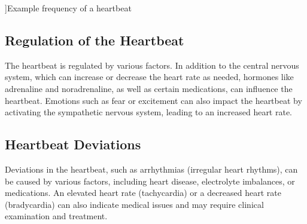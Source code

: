 {\begin{center}
        
        ]{Example frequency of a heartbeat}  \label{HeartRateFrequencies}	
    \end{center}
    
    \subsection{Regulation of the Heartbeat}
    
    The heartbeat is regulated by various factors. In addition to the central nervous system, which can increase or decrease the heart rate as needed, hormones like adrenaline and noradrenaline, as well as certain medications, can influence the heartbeat. Emotions such as fear or excitement can also impact the heartbeat by activating the sympathetic nervous system, leading to an increased heart rate. \cite{Gesenberg:2017}
    
    \subsection{Heartbeat Deviations}
    
    Deviations in the heartbeat, such as arrhythmias (irregular heart rhythms), can be caused by various factors, including heart disease, electrolyte imbalances, or medications. An elevated heart rate (tachycardia) or a decreased heart rate (bradycardia) can also indicate medical issues and may require clinical examination and treatment. \cite{Gesenberg:2017}
    
}



